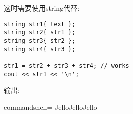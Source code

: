 \begin{itemize}
这时需要使用string代替:

\begin{lstlisting}[style=styleCXX]
string str1{ text };
string str2{ str1 };
string str3{ str2 };
string str4{ str3 };

str1 = str2 + str3 + str4; // works
cout << str1 << '\n';
\end{lstlisting}

输出:

\begin{tcblisting}{commandshell={}}
JelloJelloJello
\end{tcblisting}
\end{itemize}

